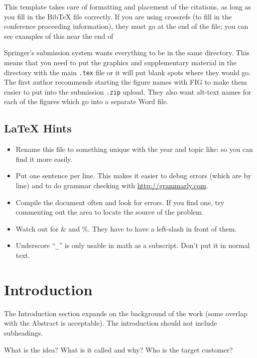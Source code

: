 \documentclass{svproc}
\begin{document}
  This template takes care of formatting and placement of the citations, as long as you fill in the BibTeX file  correctly.
  If you are using crossrefs (to fill in the conference proceeding information), they must go at the end of the  file;  you can see examples of this near the end of 

  Springer's submission system wants everything to be in the same directory.
  This means that you need to put the graphics and supplementary material in the directory with the main \verb|.tex| file or it will put blank spots where they would go.
  The first author recommends starting the figure names with FIG to make them easier to put into the submission \verb|.zip| upload.
  They also want alt-text names for each of the figures which go into a separate Word file.
  
\subsection*{\LaTeX{} Hints}\label{sec:latex-hints}
\begin{itemize}
\item Rename this file to something unique with the year and topic like:  so you can find it more easily.
\item Put one sentence per line.
  This makes it easier to debug errors (which are by line) and to do grammar checking with \url{http://grammarly.com}.
\item Compile the document often and look for errors.
  If you find one, try commenting out the area to locate the source of the problem.
\item Watch out for \& and \%.  They have to have a left-slash in front of them.
\item Underscore ``\verb|_|'' is only usable in math as a subscript.
  Don't put it in normal text.
\end{itemize}


\section{Introduction}\label{sec:introduction}
The Introduction section expands on the background of the work (some overlap with the Abstract is acceptable).
The introduction should not include subheadings.

What is the idea?  What is it called and why?
Who is the target customer?
\end{document}
